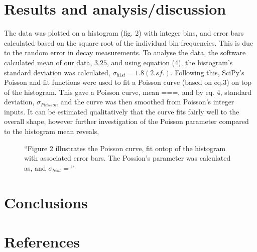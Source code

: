 \documentclass[11pt]{article}
\begin{document}
    \section{Results and analysis/discussion}
    The data was plotted on a histogram (fig. 2) with integer bins, and error bars calculated based on the square root of the individual bin frequencies. This is due to the random error in decay measurements. 
    \newline
    To analyse the data, the software calculated mean of our data, $3.25$, and using equation (4), the histogram's standard deviation was calculated, $\sigma_{hist} = 1.8 (2.sf.)$. Following this, SciPy's Poisson and fit functions were used to fit a Poisson curve (based on eq.3) on top of the histogram. This gave a Poisson curve, mean ===, and by eq. 4, standard deviation, $\sigma_{Poisson}$ and the curve was then smoothed from Poisson's integer inputs. 
    It can be estimated qualitatively that the curve fits fairly well to the overall shape, however further investigation of the Poisson parameter compared to the histogram mean reveals, 
       \begin{figure}[]
        \begin{center}
            \def\svgwidth{\columnwidth}
            
             \caption{“Figure 2 illustrates the Poisson curve, fit ontop of the histogram with associated error bars. The Possion's parameter was calculated as, and $\sigma_{hist} = $”}
             \label{fig:experimental results 1}
        \end{center}
    \end{figure}
    \section{Conclusions}
    \section{References}
\end{document}
